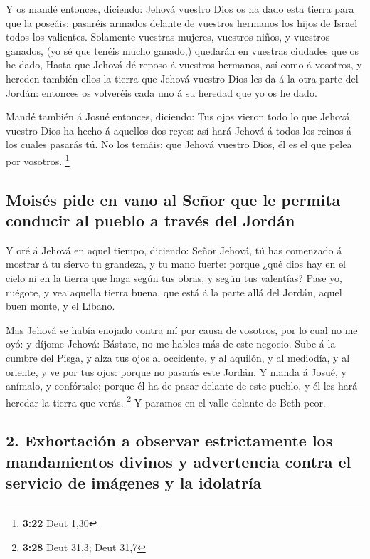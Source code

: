  Y os mandé entonces, diciendo: Jehová vuestro Dios os ha
dado esta tierra para que la poseáis: pasaréis armados delante de
vuestros hermanos los hijos de Israel todos los valientes.
 Solamente vuestras mujeres, vuestros niños, y vuestros
ganados, (yo sé que tenéis mucho ganado,) quedarán en vuestras ciudades
que os he dado,  Hasta que Jehová dé reposo á vuestros
hermanos, así como á vosotros, y hereden también ellos la tierra que
Jehová vuestro Dios les da á la otra parte del Jordán: entonces os
volveréis cada uno á su heredad que yo os he dado.

 Mandé también á Josué entonces, diciendo: Tus ojos
vieron todo lo que Jehová vuestro Dios ha hecho á aquellos dos reyes:
así hará Jehová á todos los reinos á los cuales pasarás tú.
 No los temáis; que Jehová vuestro Dios, él es el que
pelea por vosotros. \footnote{\textbf{3:22} Deut 1,30}

\hypertarget{moisuxe9s-pide-en-vano-al-seuxf1or-que-le-permita-conducir-al-pueblo-a-travuxe9s-del-jorduxe1n}{%
\subsection{Moisés pide en vano al Señor que le permita conducir al
pueblo a través del
Jordán}\label{moisuxe9s-pide-en-vano-al-seuxf1or-que-le-permita-conducir-al-pueblo-a-travuxe9s-del-jorduxe1n}}

 Y oré á Jehová en aquel tiempo, diciendo:
 Señor Jehová, tú has comenzado á mostrar á tu siervo tu
grandeza, y tu mano fuerte: porque ¿qué dios hay en el cielo ni en la
tierra que haga según tus obras, y según tus valentías? 
Pase yo, ruégote, y vea aquella tierra buena, que está á la parte allá
del Jordán, aquel buen monte, y el Líbano.

 Mas Jehová se había enojado contra mí por causa de
vosotros, por lo cual no me oyó: y díjome Jehová: Bástate, no me hables
más de este negocio.  Sube á la cumbre del Pisga, y alza
tus ojos al occidente, y al aquilón, y al mediodía, y al oriente, y ve
por tus ojos: porque no pasarás este Jordán.  Y manda á
Josué, y anímalo, y confórtalo; porque él ha de pasar delante de este
pueblo, y él les hará heredar la tierra que verás. \footnote{\textbf{3:28}
  Deut 31,3; Deut 31,7}  Y paramos en el valle delante de
Beth-peor.

\hypertarget{exhortaciuxf3n-a-observar-estrictamente-los-mandamientos-divinos-y-advertencia-contra-el-servicio-de-imuxe1genes-y-la-idolatruxeda}{%
\subsection{2. Exhortación a observar estrictamente los mandamientos
divinos y advertencia contra el servicio de imágenes y la
idolatría}\label{exhortaciuxf3n-a-observar-estrictamente-los-mandamientos-divinos-y-advertencia-contra-el-servicio-de-imuxe1genes-y-la-idolatruxeda}}

